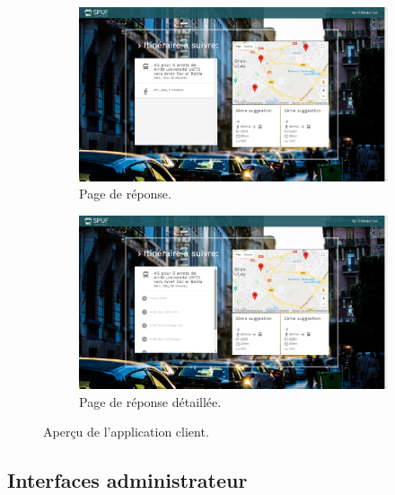 \begin{figure}
	 \begin{subfigure}[b]{\linewidth}
	 	\includegraphics[width=\linewidth]{img/spuf/response.png}
	 	\caption{Page de réponse.}
	 \end{subfigure}
	 
	 \begin{subfigure}[b]{\linewidth}
	 	\includegraphics[width=\linewidth]{img/spuf/response2.png}
	 	\caption{Page de réponse détaillée.}	 
	 \end{subfigure}
	 \caption{Aperçu de l'application client.}
\end{figure}

\newpage
\subsection{Interfaces administrateur}

